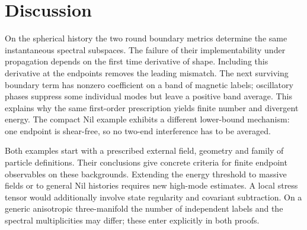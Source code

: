 \section{Discussion}\label{sec:07}
On the spherical history the two round boundary metrics determine the same instantaneous spectral subspaces. The failure of their implementability under propagation depends on the first time derivative of shape. Including this derivative at the endpoints removes the leading mismatch. The next surviving boundary term has nonzero coefficient on a band of magnetic labels; oscillatory phases suppress some individual modes but leave a positive band average. This explains why the same first-order prescription yields finite number and divergent energy. The compact Nil example exhibits a different lower-bound mechanism: one endpoint is shear-free, so no two-end interference has to be averaged.

Both examples start with a prescribed external field, geometry and family of particle definitions. Their conclusions give concrete criteria for finite endpoint observables on these backgrounds. Extending the energy threshold to massive fields or to general Nil histories requires new high-mode estimates. A local stress tensor would additionally involve state regularity and covariant subtraction. On a generic anisotropic three-manifold the number of independent labels and the spectral multiplicities may differ; these enter explicitly in both proofs.
